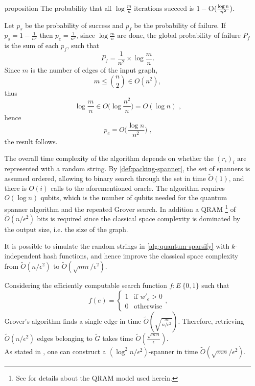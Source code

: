 \begin{theoremEnd}{proposition}
The probability that all $\log \frac mn$ iterations succeed is $1 - \textsc{O}(
\frac{\log n}{n^2})$.
\end{theoremEnd}
\begin{proofEnd}
Let $p_s$ be the probability of success and $p_f$ be the probability of failure.
If $p_s = 1-\frac{1}{n^2}$ then $p_e = \frac{1}{n^2}$, since $\log \frac{m}{n}$ are done,
the global probability of failure $P_f$ is the sum of each $p_f$, such that
$$P_f = \frac{1}{n^2} \times \log \frac{m}{n}.$$
Since $m$ is the number of edges of the input graph,
$$m \leq \binom{n}{2}\in O(n^2),$$
thus
$$\log \frac mn \in O\big(\log \frac{n^2}{n}\big) = O(\log n)\text{ ,}$$
hence
$$p_e = O\big(\frac{\log n}{n^2}\big)\text{ ,}$$
the result follows.
\end{proofEnd}

The overall time complexity of the algorithm depends on whether the $(r_i)_i$ are
represented with a random string. By \autoref{def:packing-spanner}, the set of spanners is assumed ordered,
allowing to binary search through the set in time $\tilde{O}(1)$, and there is $O(i)$ calls to the aforementioned oracle. The algorithm requires $O(\log n)$ qubits, which is the number of qubits needed
for the quantum spanner algorithm and the repeated Grover search. In addition a QRAM \footnote{See  for details about the QRAM model used herein.}
of $\tilde{O}(n/\epsilon^2)$ bits is required since the classical space complexity is dominated
by the output size, i.e. the size of the graph.


It is possible to simulate the random strings in
\autoref{alg:quantum-sparsify} with $k$-independent hash functions, and hence improve the classical space complexity from
$\tilde{O}(n/\epsilon^2)$ to $\tilde{O}(\sqrt{mn}/\epsilon^2)$.


Considering the efficiently computable search function $f : E \> \{0,1\}$
such that
\begin{equation*}
       f(e) = \begin{cases}
       1  & \text{if } w'_e >0 \\
       0 & \text{otherwise}
       \end{cases}
    \text{,}
\end{equation*}
Grover's algorithm finds a single edge in time $\tilde{O}(\sqrt{\frac{m}{n/\epsilon^2}})$. Therefore, retrieving $\tilde{O}(n/\epsilon^2)$ edges
belonging to $\tilde{G}$ takes time $\tilde{O}(\frac{\sqrt{m\,n}}{\epsilon})$. \\
As stated in , one can construct a $(\log^2 n / \epsilon^2)$-spanner in time $\tilde{O}(\sqrt{mn}/\epsilon^2)$.

